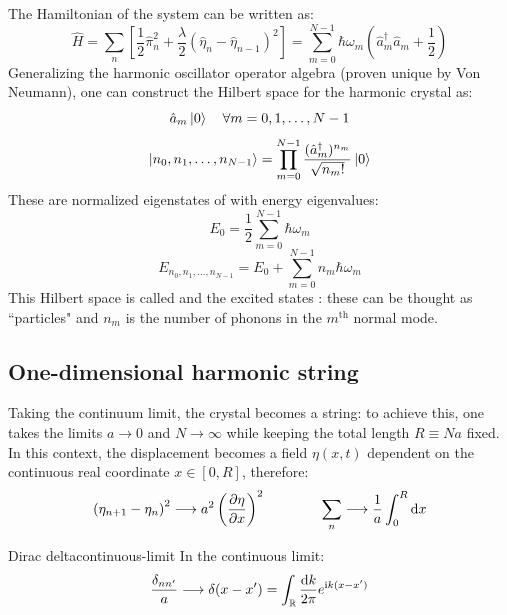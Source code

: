 The Hamiltonian of the system can be written as:
\begin{equation}
  \hat{H} = \sum_{n} \left[ \frac{1}{2} \hat{\pi}_n^2 + \frac{\lambda}{2} \left( \hat{\eta}_n - \hat{\eta}_{n-1} \right)^2 \right] = \sum_{m = 0}^{N - 1} \hbar \omega_m \left( \hat{a}_m^\dagger \hat{a}_m + \frac{1}{2} \right)
\end{equation}
Generalizing the harmonic oscillator operator algebra (proven unique by Von Neumann), one can construct the Hilbert space for the harmonic crystal as:
\begin{equation}
  \hat{a}_m \ket{0} \quad \forall m = 0, 1, \dots, N - 1
\end{equation}
\begin{equation}
  \ket{n_0, n_1, \dots, n_{N-1}} = \prod_{m = 0}^{N - 1} \frac{( \hat{a}_m^\dagger )^{n_m}}{\sqrt{n_m!}} \ket{0}
\end{equation}
These are normalized eigenstates of  with energy eigenvalues:
\begin{equation}
  E_0 = \frac{1}{2} \sum_{m = 0}^{N - 1} \hbar \omega_m
  \label{eq:first-harm}
\end{equation}
\begin{equation}
  E_{n_0, n_1, \dots, n_{N-1}} = E_0 + \sum_{m = 0}^{N - 1} n_m \hbar \omega_m
\end{equation}
This Hilbert space is called  and the excited states : these can be thought as ``particles" and $ n_m $ is the number of phonons in the $ m^{\mathrm{th}} $ normal mode.

\subsection{One-dimensional harmonic string}

Taking the continuum limit, the crystal becomes a string: to achieve this, one takes the limits $ a \rightarrow 0 $ and $ N \rightarrow \infty $ while keeping the total length $ R \equiv N a $ fixed. In this context, the displacement becomes a field $ \eta(x,t) $ dependent on the continuous real coordinate $ x \in [0, R] $, therefore:
\begin{equation*}
  \left( \eta_{n + 1} - \eta_n \right)^2 \longrightarrow a^2 \left( \frac{\partial \eta}{\partial x} \right)^2
  \qquad \qquad
  \sum_{n} \longrightarrow \frac{1}{a} \int_0^R \mathrm{d} x
\end{equation*}

\begin{proposition}{Dirac delta}{continuous-limit}
  In the continuous limit:
  \begin{equation*}
    \frac{\delta_{nn'}}{a} \longrightarrow \delta(x - x') = \int_{\mathbb{R}} \frac{\mathrm{d} k}{2\pi} e^{\mathrm{i} k (x - x')}
  \end{equation*}
\end{proposition}

